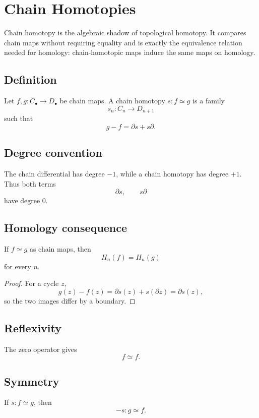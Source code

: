 ﻿\chapter{Chain Homotopies}
\label{ch:viii22-chain-homotopies}

Chain homotopy is the algebraic shadow of topological homotopy.  It compares
chain maps without requiring equality and is exactly the equivalence relation
needed for homology: chain-homotopic maps induce the same maps on homology.

\section{Definition}

\begin{definition}
\label{def:viii22-chain-homotopy}
Let \(f,g:C_\bullet\to D_\bullet\) be chain maps.  A chain homotopy
\(s:f\simeq g\) is a family
\[
s_n:C_n\to D_{n+1}
\]
such that
\[
g-f=\partial s+s\partial.
\]
\end{definition}

\section{Degree convention}
The chain differential has degree \(-1\), while a chain homotopy has degree
\(+1\).  Thus both terms
\[
\partial s,\qquad s\partial
\]
have degree \(0\).

\section{Homology consequence}
\begin{theorem}
\label{thm:viii22-homology-invariance}
If \(f\simeq g\) as chain maps, then
\[
H_n(f)=H_n(g)
\]
for every \(n\).
\end{theorem}

\begin{proof}
For a cycle \(z\),
\[
g(z)-f(z)=\partial s(z)+s(\partial z)=\partial s(z),
\]
so the two images differ by a boundary.
\end{proof}

\section{Reflexivity}
The zero operator gives
\[
f\simeq f.
\]

\section{Symmetry}
If \(s:f\simeq g\), then
\[
-s:g\simeq f.
\]


